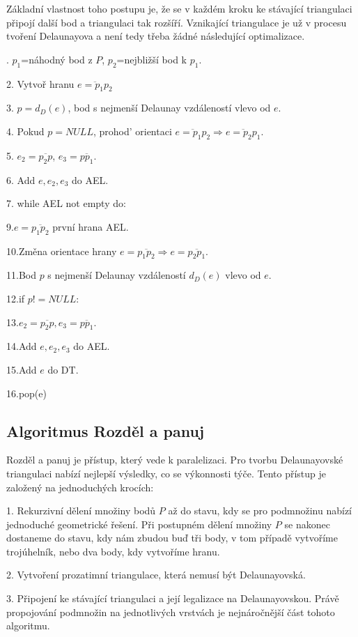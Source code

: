 \documentclass[12pt,a4paper]{article}
\begin{document}
Základní vlastnost toho postupu je, že se v každém kroku ke stávající triangulaci připojí další bod a triangulaci tak rozšíří. Vznikající triangulace je už v procesu tvoření Delaunayova a není tedy třeba žádné následující optimalizace.

. $p_1$=náhodný bod z $P$, $p_2$=nejbližší bod k $p_1$.

2. Vytvoř hranu $\overline{e=p_1p_2}$

3. $p=d_D(e)$, bod s nejmenší Delaunay vzdáleností vlevo od $e$.

4. Pokud $p=NULL$, prohod’ orientaci $\overline{e=p_1p_2} \Rightarrow \overline{e=p_2p_1}$.

5. $e_2=\overline{p_2p}$, $e_3=\overline{pp_1}$.

6. Add $e, e_2, e_3$ do AEL.

7. while AEL not empty do:

9.\indent  $e=\overline{p_1p_2}$ první hrana AEL.

10.\indent  Změna orientace hrany $e=\overline{p_1p_2} \Rightarrow e=\overline{p_2p_1}$.

11.\indent  Bod $p$ s nejmenší Delaunay vzdáleností $d_D(e)$ vlevo od $e$.

12.\indent  if $p! =NULL:$

13.\indent \indent $e_2=\overline{p_2p}, e_3=\overline{pp_1}$.

14.\indent \indent Add $e, e_2, e_3$ do AEL.

15.\indent \indent Add $e$ do DT.

16.\indent pop(e)


\subsection{Algoritmus Rozděl a panuj}

Rozděl a panuj je přístup, který vede k paralelizaci. Pro tvorbu Delaunayovské triangulaci nabízí nejlepší výsledky, co se výkonnosti týče. Tento přístup je založený na jednoduchých krocích:

1. Rekurzivní dělení množiny bodů $P$ až do stavu, kdy se pro podmnožinu nabízí jednoduché geometrické řešení. Při postupném dělení množiny $P$ se nakonec dostaneme do stavu, kdy nám zbudou buď tři body, v tom případě vytvoříme trojúhelník, nebo dva body, kdy vytvoříme hranu.

2. Vytvoření prozatimní triangulace, která nemusí být Delaunayovská.

3. Připojení ke stávající triangulaci a její legalizace na Delaunayovskou. Právě propojování podmnožin na jednotlivých vrstvách je nejnáročnější část tohoto algoritmu.
\end{document}
